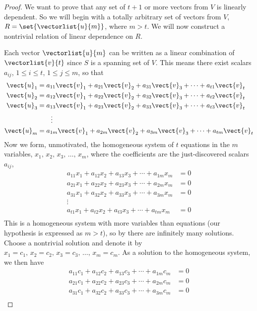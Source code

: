 \begin{proof}
We want to prove that any set of $t+1$ or more vectors from $V$ is linearly dependent.  So we will begin with a totally arbitrary set of vectors from $V$, $R=\set{\vectorlist{u}{m}}$, where $m>t$.  We will now construct a nontrivial relation of linear dependence on $R$.\par
%
Each vector $\vectorlist{u}{m}$ can be written as a linear combination of $\vectorlist{v}{t}$ since $S$ is a spanning set of $V$.  This means there exist scalars  $a_{ij}$, $1\leq i\leq t$, $1\leq j\leq m$, so that
%
\begin{align*}
\vect{u}_1&=a_{11}\vect{v}_1+a_{21}\vect{v}_2+a_{31}\vect{v}_3+\cdots+a_{t1}\vect{v}_t\\
\vect{u}_2&=a_{12}\vect{v}_1+a_{22}\vect{v}_2+a_{32}\vect{v}_3+\cdots+a_{t2}\vect{v}_t\\
\vect{u}_3&=a_{13}\vect{v}_1+a_{23}\vect{v}_2+a_{33}\vect{v}_3+\cdots+a_{t3}\vect{v}_t\\
&\quad\quad\vdots\\
\vect{u}_m&=a_{1m}\vect{v}_1+a_{2m}\vect{v}_2+a_{3m}\vect{v}_3+\cdots+a_{tm}\vect{v}_t
\end{align*}
%
Now we form, unmotivated, the homogeneous system of $t$ equations in the $m$ variables, $x_1,\,x_2,\,x_3,\,\ldots,\,x_m$, where the coefficients are the just-discovered scalars $a_{ij}$,
%
\begin{align*}
a_{11}x_1+a_{12}x_2+a_{13}x_3+\cdots+a_{1m}x_m&=0\\
a_{21}x_1+a_{22}x_2+a_{23}x_3+\cdots+a_{2m}x_m&=0\\
a_{31}x_1+a_{32}x_2+a_{33}x_3+\cdots+a_{3m}x_m&=0\\
\vdots\quad\quad&\\
a_{t1}x_1+a_{t2}x_2+a_{t3}x_3+\cdots+a_{tm}x_m&=0\\
\end{align*}
%
This is a homogeneous system with more variables than equations (our hypothesis is expressed as $m>t$), so by  there are infinitely many solutions.  Choose a nontrivial solution and denote it by $x_1=c_1,\,x_2=c_2,\,x_3=c_3,\,\ldots,\,x_m=c_m$.  As a solution to the homogeneous system, we then have
%
\begin{align*}
a_{11}c_1+a_{12}c_2+a_{13}c_3+\cdots+a_{1m}c_m&=0\\
a_{21}c_1+a_{22}c_2+a_{23}c_3+\cdots+a_{2m}c_m&=0\\
a_{31}c_1+a_{32}c_2+a_{33}c_3+\cdots+a_{3m}c_m&=0\\

\end{align*}
\end{proof}
